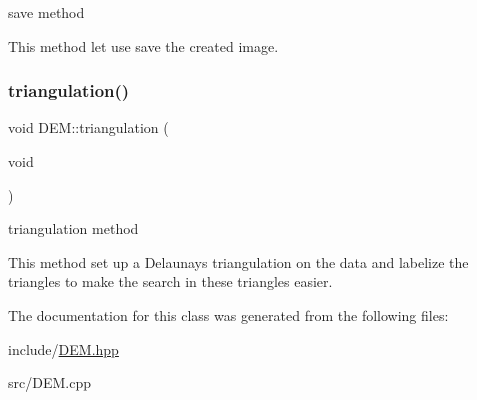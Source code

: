 save method 

This method let use save the created image. \mbox{\label{classDEM_aadcc1b7e58d927d53d98356ad564ff30}} 
\subsubsection{\texorpdfstring{triangulation()}{triangulation()}}
{\footnotesize\ttfamily void D\+E\+M\+::triangulation (\begin{DoxyParamCaption}\item[{void}]{ }\end{DoxyParamCaption})}



triangulation method 

This method set up a Delaunay\textquotesingle{}s triangulation on the data and labelize the triangles to make the search in these triangles easier. 

The documentation for this class was generated from the following files\+:\begin{DoxyCompactItemize}
\item 
include/\hyperlink{DEM_8hpp}{D\+E\+M.\+hpp}\item 
src/D\+E\+M.\+cpp\end{DoxyCompactItemize}
